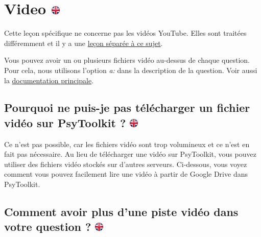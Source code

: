 \documentclass[
]{book}
\begin{document}
\hypertarget{video}{%
\section[Video ]{\texorpdfstring{Video \href{https://www.psytoolkit.org/lessons/surveyaudiovideo.html\#_video}{\protect\includegraphics{img/ukflag.png}}}{Video }}\label{video}}

Cette leçon spécifique ne concerne pas les vidéos YouTube. Elles sont traitées différemment et il y a une \href{https://www.psytoolkit.org/lessons/youtube_video.html}{leçon séparée à ce sujet}.

Vous pouvez avoir un ou plusieurs fichiers vidéo au-dessus de chaque question. Pour cela, nous utilisons l'option \emph{a:} dans la description de la question. Voir aussi la \protect\hyperlink{s8}{documentation principale}.

\hypertarget{pourquoi-ne-puis-je-pas-tuxe9luxe9charger-un-fichier-viduxe9o-sur-psytoolkit}{%
\subsection[Pourquoi ne puis-je pas télécharger un fichier vidéo sur PsyToolkit ? ]{\texorpdfstring{Pourquoi ne puis-je pas télécharger un fichier vidéo sur PsyToolkit ? \href{https://www.psytoolkit.org/lessons/surveyaudiovideo.html\#_why_can_i_not_upload_a_video_file_to_psytoolkit}{\protect\includegraphics{img/ukflag.png}}}{Pourquoi ne puis-je pas télécharger un fichier vidéo sur PsyToolkit ? }}\label{pourquoi-ne-puis-je-pas-tuxe9luxe9charger-un-fichier-viduxe9o-sur-psytoolkit}}

Ce n'est pas possible, car les fichiers vidéo sont trop volumineux et ce n'est en fait pas nécessaire. Au lieu de télécharger une vidéo sur PsyToolkit, vous pouvez utiliser des fichiers vidéo stockés sur d'autres serveurs. Ci-dessous, vous voyez comment vous pouvez facilement lire une vidéo à partir de Google Drive dans PsyToolkit.

\hypertarget{comment-avoir-plus-dune-piste-viduxe9o-dans-votre-question}{%
\subsection[Comment avoir plus d'une piste vidéo dans votre question ? ]{\texorpdfstring{Comment avoir plus d'une piste vidéo dans votre question ? \href{https://www.psytoolkit.org/lessons/surveyaudiovideo.html\#_how_to_have_more_than_one_audio_track_in_your_question}{\protect\includegraphics{img/ukflag.png}}}{Comment avoir plus d'une piste vidéo dans votre question ? }}\label{comment-avoir-plus-dune-piste-viduxe9o-dans-votre-question}}
\end{document}
